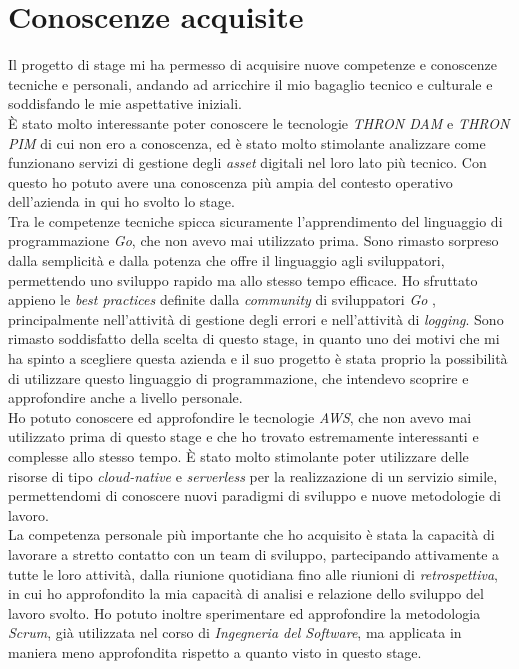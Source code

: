 \section{Conoscenze acquisite}
Il progetto di stage mi ha permesso di acquisire nuove competenze e conoscenze
tecniche e personali, andando ad arricchire il mio bagaglio tecnico e culturale
e soddisfando le mie aspettative iniziali.\\
È stato molto interessante poter conoscere le tecnologie \emph{THRON DAM} e
\emph{THRON PIM} di cui non ero a conoscenza, ed è stato molto stimolante
analizzare come funzionano servizi di gestione degli \emph{asset} digitali nel
loro lato più tecnico. Con questo ho potuto avere una conoscenza più ampia del
contesto operativo dell'azienda in qui ho svolto lo stage.\\
Tra le competenze tecniche spicca sicuramente l'apprendimento del linguaggio di
programmazione \emph{Go}, che non avevo mai utilizzato prima. Sono rimasto
sorpreso dalla semplicità e dalla potenza che offre il linguaggio agli
sviluppatori, permettendo uno sviluppo rapido ma allo stesso tempo
efficace. Ho sfruttato appieno le \emph{best practices} definite dalla
\emph{community} di sviluppatori \emph{Go} \cite{effective-go}, principalmente nell'attività di
gestione degli errori e nell'attività di \emph{logging}. Sono rimasto
soddisfatto della scelta di questo stage, in quanto uno dei motivi che mi ha
spinto a scegliere questa azienda e il suo progetto è stata proprio la
possibilità di utilizzare questo linguaggio di programmazione, che intendevo
scoprire e approfondire anche a livello personale.\\
Ho potuto conoscere ed approfondire le tecnologie \emph{AWS}, che non avevo mai
utilizzato prima di questo stage e che ho trovato estremamente interessanti e
complesse allo stesso tempo. È stato molto stimolante poter utilizzare delle
risorse di tipo \emph{cloud-native} e \emph{serverless} per la realizzazione di
un servizio simile, permettendomi di conoscere nuovi paradigmi di sviluppo e
nuove metodologie di lavoro.\\
La competenza personale più importante che ho acquisito è stata la capacità di
lavorare a stretto contatto con un team di sviluppo, partecipando attivamente a
tutte le loro attività, dalla riunione quotidiana fino alle riunioni di
\emph{retrospettiva}, in cui ho approfondito la mia capacità di analisi e
relazione dello sviluppo del lavoro svolto. Ho potuto inoltre sperimentare ed
approfondire la metodologia \emph{Scrum}, già utilizzata nel corso di
\emph{Ingegneria del Software}, ma applicata in maniera meno approfondita
rispetto a quanto visto in questo stage.


